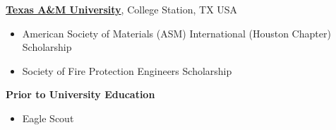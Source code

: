 \documentclass[line,margin]{res}
\begin{document}
\begin{resume}
\href{http://www.tamu.edu/}{\textbf{Texas A\&M University}}, College Station, TX USA
\begin{itemize}
\item American Society of Materials (ASM) International (Houston Chapter) Scholarship
\item Society of Fire Protection Engineers Scholarship
\end{itemize}

\textbf{Prior to University Education}
\begin{itemize}
\item Eagle Scout
\end{itemize}

\end{resume}
\end{document}
